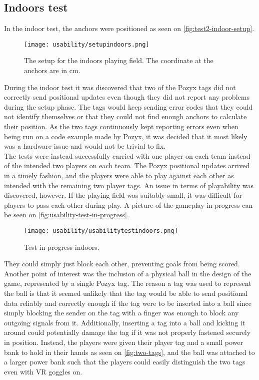 \subsection{Indoors test}
In the indoor test, the anchors were positioned as seen on \autoref{fig:test2-indoor-setup}.
\begin{figure}[H]
    \centering
    \texttt{[image: usability/setupindoors.png]}
    \caption{The setup for the indoors playing field. The coordinate at the anchors are in cm.}
    \label{fig:test2-indoor-setup}
\end{figure}
\noindent
During the indoor test it was discovered that two of the Pozyx tags did not correctly send positional updates even though they did not report any problems during the setup phase.
The tags would keep sending error codes that they could not identify themselves or that they could not find enough anchors to calculate their position.
As the two tags continuously kept reporting errors even when being run on a code example made by Pozyx, it was decided that it most likely was a hardware issue and would not be trivial to fix.
\\
The tests were instead successfully carried with one player on each team instead of the intended two players on each team.
The Pozyx positional updates arrived in a timely fashion, and the players were able to play against each other as intended with the remaining two player tags.
An issue in terms of playability was discovered, however.
If the playing field was suitably small, it was difficult for players to pass each other during play.
A picture of the gameplay in progress can be seen on \autoref{fig:usability-test-in-progress}.
\begin{figure}[H]
    \centering
    \texttt{[image: usability/usabilitytestindoors.png]}
    \caption{Test in progress indoors.}
    \label{fig:usability-test-in-progress}
\end{figure}
\noindent
They could simply just block each other, preventing goals from being scored.
Another point of interest was the inclusion of a physical ball in the design of the game, represented by a single Pozyx tag.
The reason a tag was used to represent the ball is that it seemed unlikely that the tag would be able to send positional data reliably and correctly enough if the tag were to be inserted into a ball since simply blocking the sender on the tag with a finger was enough to block any outgoing signals from it.
Additionally, inserting a tag into a ball and kicking it around could potentially damage the tag if it was not properly fastened securely in position.
Instead, the players were given their player tag and a small power bank to hold in their hands as seen on \autoref{fig:two-tags}, and the ball was attached to a larger power bank such that the players could easily distinguish the two tags even with VR goggles on.

